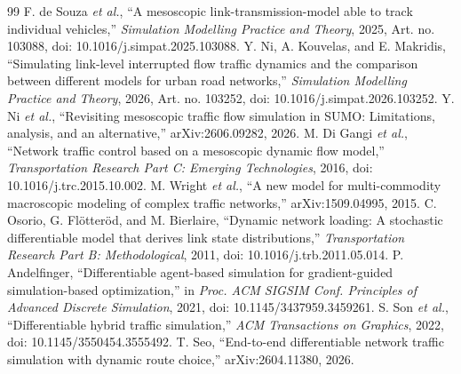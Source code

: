 \documentclass[11pt,a4paper]{article}
\begin{document}
\begin{thebibliography}{99}
 F. de Souza \emph{et al.}, ``A mesoscopic link-transmission-model able to track individual vehicles,'' \emph{Simulation Modelling Practice and Theory}, 2025, Art. no. 103088, doi: 10.1016/j.simpat.2025.103088.
 Y. Ni, A. Kouvelas, and E. Makridis, ``Simulating link-level interrupted flow traffic dynamics and the comparison between different models for urban road networks,'' \emph{Simulation Modelling Practice and Theory}, 2026, Art. no. 103252, doi: 10.1016/j.simpat.2026.103252.
 Y. Ni \emph{et al.}, ``Revisiting mesoscopic traffic flow simulation in SUMO: Limitations, analysis, and an alternative,'' arXiv:2606.09282, 2026.
 M. Di Gangi \emph{et al.}, ``Network traffic control based on a mesoscopic dynamic flow model,'' \emph{Transportation Research Part C: Emerging Technologies}, 2016, doi: 10.1016/j.trc.2015.10.002.
 M. Wright \emph{et al.}, ``A new model for multi-commodity macroscopic modeling of complex traffic networks,'' arXiv:1509.04995, 2015.
 C. Osorio, G. Flötteröd, and M. Bierlaire, ``Dynamic network loading: A stochastic differentiable model that derives link state distributions,'' \emph{Transportation Research Part B: Methodological}, 2011, doi: 10.1016/j.trb.2011.05.014.
 P. Andelfinger, ``Differentiable agent-based simulation for gradient-guided simulation-based optimization,'' in \emph{Proc. ACM SIGSIM Conf. Principles of Advanced Discrete Simulation}, 2021, doi: 10.1145/3437959.3459261.
 S. Son \emph{et al.}, ``Differentiable hybrid traffic simulation,'' \emph{ACM Transactions on Graphics}, 2022, doi: 10.1145/3550454.3555492.
 T. Seo, ``End-to-end differentiable network traffic simulation with dynamic route choice,'' arXiv:2604.11380, 2026.
\end{thebibliography}
\end{document}
